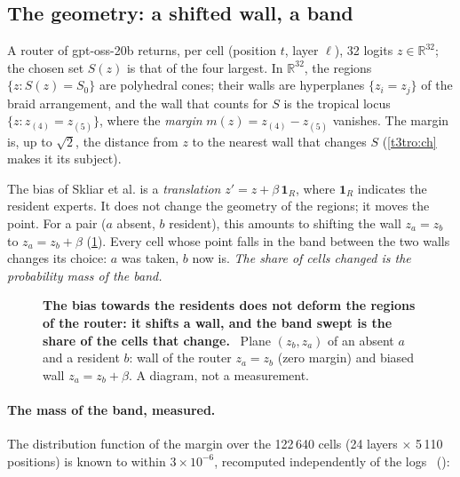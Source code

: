\subsection{The geometry: a shifted wall, a band}\label{t3mim:sec:p3-geometrie}

A router of gpt-oss-20b returns, per cell (position $t$, layer $\ell$), 32 logits $z \in \mathbb{R}^{32}$; the chosen set $S(z)$ is that of the four largest. In $\mathbb{R}^{32}$, the regions $\{z : S(z) = S_0\}$ are polyhedral cones; their walls are hyperplanes $\{z_i = z_j\}$ of the braid arrangement, and the wall that counts for $S$ is the tropical locus $\{z : z_{(4)} = z_{(5)}\}$, where the \emph{margin} $m(z) = z_{(4)} - z_{(5)}$ vanishes. The margin is, up to $\sqrt 2$, the distance from $z$ to the nearest wall that changes $S$ (\cref{t3tro:ch} makes it its subject).

The bias of Skliar et al. is a \emph{translation} $z' = z + \beta\,\mathbf{1}_R$, where $\mathbf{1}_R$ indicates the resident experts. It does not change the geometry of the regions; it moves the point. For a pair ($a$ absent, $b$ resident), this amounts to shifting the wall $z_a = z_b$ to $z_a = z_b + \beta$ (\cref{fig:t3-mim-p3-paroi}). Every cell whose point falls in the band between the two walls changes its choice: $a$ was taken, $b$ now is. \emph{The share of cells changed is the probability mass of the band.}

\begin{figure}[tbp]
\centering
{}
\caption[P3: the wall of the router shifted by $\beta$]{\textbf{The bias towards the residents does not deform the regions of the router: it shifts a wall, and the band swept is the share of the cells that change.} \schema~Plane $(z_b, z_a)$ of an absent $a$ and a resident $b$: wall of the router $z_a = z_b$ (zero margin) and biased wall $z_a = z_b + \beta$. A diagram, not a measurement. \HorsStyle{}}
\label{fig:t3-mim-p3-paroi}
\end{figure}

\paragraph{The mass of the band, measured.} The distribution function of the margin over the 122\,640 cells (24 layers $\times$ 5\,110 positions) is known to within $3 \times 10^{-6}$, recomputed independently of the logs \mes~():

